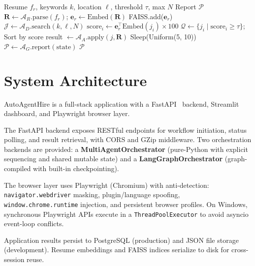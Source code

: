 \documentclass[conference]{IEEEtran}
\begin{document}
\begin{algorithm}[htbp]
\caption{AutoAgentHire Orchestration}
\label{alg:workflow}
\begin{algorithmic}[1]
\REQUIRE Resume $f_r$, keywords $k$, location $\ell$, threshold $\tau$, max $N$
\ENSURE Report $\mathcal{P}$
\STATE $\mathbf{R} \leftarrow \mathcal{A}_R.\text{parse}(f_r)$; \quad $\mathbf{e}_r \leftarrow \text{Embed}(\mathbf{R})$
\STATE FAISS.add($\mathbf{e}_r$)
\STATE $\mathcal{J} \leftarrow \mathcal{A}_D.\text{search}(k, \ell, N)$
    \STATE $\text{score}_i \leftarrow \mathbf{e}_r^\top \text{Embed}(j_i) \times 100$
\ENDFOR
\STATE $\mathcal{Q} \leftarrow \{j_i \mid \text{score}_i \geq \tau\}$; Sort by score
    \STATE result $\leftarrow \mathcal{A}_A.\text{apply}(j, \mathbf{R})$
    \STATE Sleep(Uniform(5, 10))
\ENDFOR
\STATE $\mathcal{P} \leftarrow \mathcal{A}_G.\text{report}(\text{state})$
\RETURN $\mathcal{P}$
\end{algorithmic}
\end{algorithm}

\section{System Architecture}

AutoAgentHire is a full-stack application with a FastAPI~\cite{fastapi} backend, Streamlit dashboard, and Playwright browser layer.

The FastAPI backend exposes RESTful endpoints for workflow initiation, status polling, and result retrieval, with CORS and GZip middleware. Two orchestration backends are provided: a \textbf{MultiAgentOrchestrator} (pure-Python with explicit sequencing and shared mutable state) and a \textbf{LangGraphOrchestrator} (graph-compiled with built-in checkpointing).

The browser layer uses Playwright (Chromium) with anti-detection: \texttt{navigator.webdriver} masking, plugin/language spoofing, \texttt{window.chrome.runtime} injection, and persistent browser profiles. On Windows, synchronous Playwright APIs execute in a \texttt{ThreadPoolExecutor} to avoid asyncio event-loop conflicts.

Application results persist to PostgreSQL (production) and JSON file storage (development). Resume embeddings and FAISS indices serialize to disk for cross-session reuse.
\end{document}
